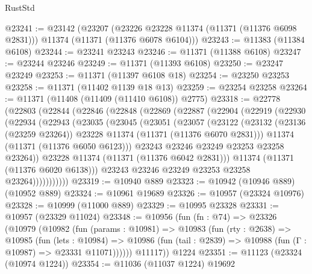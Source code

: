 \begin{lexlean}{RustStd}
\begin{coremodule}
@23241 := @23142
    (@23207
      (@23226 @23228 @11374 (@11371 (@11376 @6098 @2831)))
      @11374
      (@11371 (@11376 @6078 @6104)))
@23243 := @11383 (@11384 @6108)
@23244 := @23241 @23243
@23246 := @11371 (@11388 @6108)
@23247 := @23244 @23246
@23249 := @11371 (@11393 @6108)
@23250 := @23247 @23249
@23253 := @11371 (@11397 @6108 @18)
@23254 := @23250 @23253
@23258 := @11371 (@11402 @1139 @18 @13)
@23259 := @23254 @23258
@23264 := @11371 (@11408 (@11409 (@11410 @6108)) @2775)
@23318 := @22778
    (@22803
      (@22844
        (@22846
          (@22848
            (@22869
              (@22887
                (@22904
                  (@22919
                    (@22930
                      (@22934
                        (@22943
                          (@23035
                            (@23045
                              (@23051
                                (@23057
                                  (@23122
                                    (@23132
                                      (@23136 (@23259 @23264))
                                      @23228
                                      @11374
                                      (@11371 (@11376 @6070 @2831)))
                                    @11374
                                    (@11371 (@11376 @6050 @6123)))
                                  @23243
                                  @23246
                                  @23249
                                  @23253
                                  @23258
                                  @23264))
                              @23228
                              @11374
                              (@11371 (@11376 @6042 @2831)))
                            @11374
                            (@11371 (@11376 @6020 @6138)))
                          @23243
                          @23246
                          @23249
                          @23253
                          @23258
                          @23264)))))))))))
@23319 := @10940 @889
@23323 := @10942 (@10946 @889) (@10952 @889)
@23324 := @10961 @19689
@23326 := @10957 (@23324 @10976)
@23328 := @10999 (@11000 @889)
@23329 := @10995 @23328
@23331 := @10957 (@23329 @11024)
@23348 := @10956
    (fun (fn : @74) =>
    @23326
      (@10979
        (@10982
          (fun (params : @10981) =>
          @10983
            (fun (rty : @2638) =>
            @10985
              (fun (lets : @10984) =>
              @10986 (fun (tail : @2839) => @10988 (fun (Γ : @10987) => @23331 @11071))))))
        @11117))
    @1224
@23351 := @11123 (@23324 (@10974 @1224))
@23354 := @11036 (@11037 @1224) @19692

\end{coremodule}
\end{lexlean}
